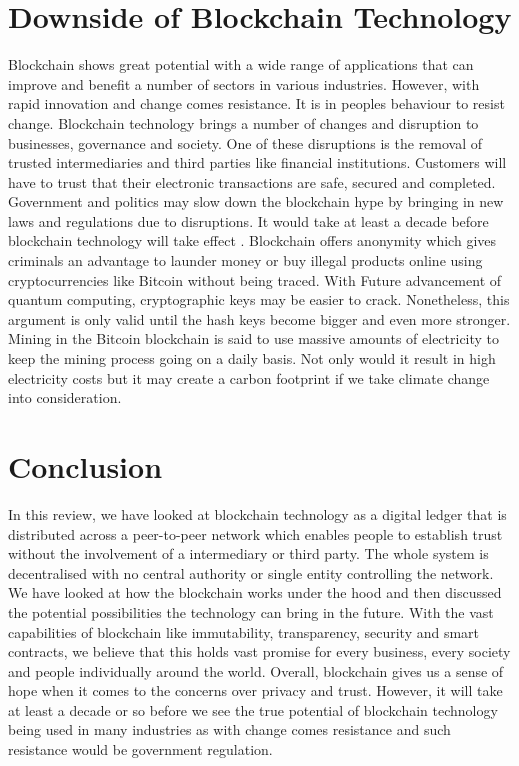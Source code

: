 \documentclass[report]{IEEEtran}
\begin{document}
\section{Downside of Blockchain Technology}
Blockchain shows great potential with a wide range of applications that can improve and benefit a number of sectors in various industries. However, with rapid innovation and change comes resistance. It is in peoples behaviour to resist change. Blockchain technology brings a number of changes and disruption to businesses, governance and society. One of these disruptions is the removal of trusted intermediaries and third parties like financial institutions. Customers will have to trust that their electronic transactions are safe, secured and completed. Government and politics may slow down the blockchain hype by bringing in new laws and regulations due to disruptions. It would take at least a decade before blockchain technology will take effect \cite{time}. Blockchain offers anonymity which gives criminals an advantage to launder money or buy illegal products online using cryptocurrencies like Bitcoin without being traced. With Future advancement of quantum computing, cryptographic keys may be easier to crack. Nonetheless, this argument is only valid until the hash keys become bigger and even more stronger. Mining in the Bitcoin blockchain is said to use massive amounts of electricity to keep the mining process going on a daily basis. Not only would it result in high electricity costs but it may create a carbon footprint if we take climate change into consideration.

\section{Conclusion}
In this review, we have looked at blockchain technology as a digital ledger that is distributed across a peer-to-peer network which enables people to establish trust without the involvement of a intermediary or third party. The whole system is decentralised with no central authority or single entity controlling the network. We have looked at how the blockchain works under the hood and then discussed the potential possibilities the technology can bring in the future. With the vast capabilities of blockchain like immutability, transparency, security and smart contracts, we believe that this holds vast promise for every business, every society and people individually around the world. Overall, blockchain gives us a sense of hope when it comes to the concerns over privacy and trust. However, it will take at least a decade or so before we see the true potential of blockchain technology being used in many industries as with change comes resistance and such resistance would be government regulation. 
\end{document}
